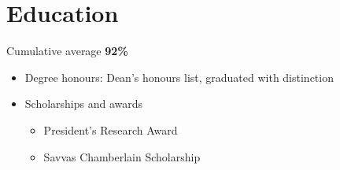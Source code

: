 \documentclass{moderncv}
\begin{document}
\begin{comment}
\cventry{Sep 2021 - Nov 2021}{Pipelined 32-Bit RISC-V Core}{}{Verilog | Verilator}{}
{\begin{itemize}
    \item Implemented RV32I spec in \textbf{Verilog} using a 5-stage pipeline design with register bypassing, simulated test programs (individual instructions and benchmark algorithms) using \textbf{Verilator} to verify design
\end{itemize}}
\end{comment}

\begin{comment}
\cventry{May 2021 - Sep 2021}{Real-Time Operating System Kernel}{}{C | ARM Assembly | Keil uVision}{}
{\begin{itemize}
    \item Implements custom memory manager, EDF scheduler, IPC, and interrupt-based I/O
    \item Targets \textbf{ARM Cortex-M3} processor, implemented context switching in assembly
    \item Allows user to run custom commands through \textbf{UART} terminal
\end{itemize}}
\end{comment}

\section{Education}
{
    Cumulative average \textbf{92\%}
    \begin{itemize}
        \item Degree honours: Dean's honours list, graduated with distinction
        \item Scholarships and awards
        \begin{itemize}
            \item President's Research Award
            \item Savvas Chamberlain Scholarship
        \end{itemize}
    \end{itemize}
}
\end{document}
